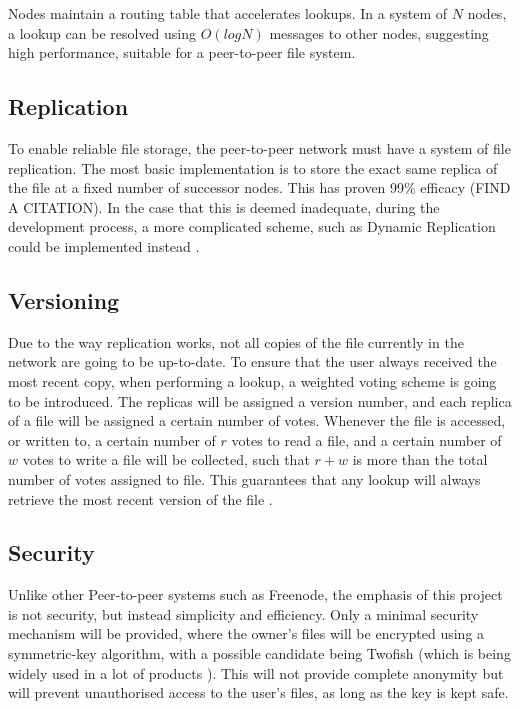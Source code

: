 \documentclass[8pt,a4paper]{article}
\begin{document}
Nodes maintain a routing table that accelerates lookups. In a system of $N$ nodes, a lookup can be resolved using $O(log N)$ messages to other nodes, suggesting high performance, suitable for a peer-to-peer file system.

\subsection{Replication}
To enable reliable file storage, the peer-to-peer network must have a system of file replication. The most basic implementation is to store the exact same replica of the file at a fixed number of successor nodes. This has proven 99\% efficacy (FIND A CITATION).
In the case that this is deemed inadequate, during the development process, a more complicated scheme, such as Dynamic Replication could be implemented instead \cite{dhash}.

\subsection{Versioning}
Due to the way replication works, not all copies of the file currently in the network are going to be up-to-date. To ensure that the user always received the most recent copy, when performing a lookup, a weighted voting scheme is going to be introduced. The replicas will be assigned a version number, and each replica of a file will be assigned a certain number of votes. Whenever the file is accessed, or written to, a certain number of $r$ votes to read a file, and a certain number of $w$ votes to write a file will be collected, such that $r + w$ is more than the total number of votes assigned to file. This guarantees that any lookup will always retrieve the most recent version of the file \cite{versioning}.

\subsection{Security}

Unlike other Peer-to-peer systems such as Freenode, the emphasis of this project is not security, but instead simplicity and efficiency. Only a minimal security mechanism will be provided, where the owner's files will be encrypted using a symmetric-key algorithm, with a possible candidate being Twofish (which is being widely used in a lot of products \cite{twofishprod}).
This will not provide complete anonymity but will prevent unauthorised access to the user's files, as long as the key is kept safe.
\end{document}
